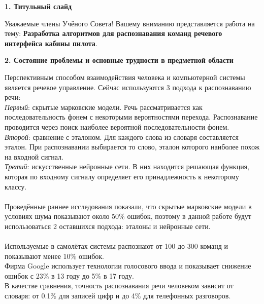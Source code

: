 \documentclass[a4paper, 12pt]{article}
\begin{document}
	
	\begin{center}
		\textbf{\large 1. Титульный слайд}
	\end{center}	
	\noindent
	Уважаемые члены Учёного Совета! Вашему вниманию представляется работа на тему: \textbf{Разработка алгоритмов для распознавания команд речевого интерфейса кабины пилота}.
	
	
	
	\begin{center}
		\textbf{\large 2. Состояние проблемы и основные трудности в предметной области}
	\end{center}	
	\noindent
	Перспективным способом взаимодействия человека и компьютерной системы является речевое управление. Сейчас используются 3 подхода к распознаванию речи:
	\\
	\textit{Первый}: скрытые марковские модели. Речь рассматривается как последовательность фонем с некоторыми вероятностями перехода. Распознавание проводится через поиск наиболее вероятной последовательности фонем.
	\\
	\textit{Второй}: сравнение с эталоном. Для каждого слова из словаря составляется эталон. При распознавании выбирается то слово, эталон которого наиболее похож на входной сигнал.
	\\
	\textit{Третий}: искусственные нейронные сети. В них находится решающая функция, которая по входному сигналу определяет его принадлежность к некоторому классу.
	\\\\
	Проведённые раннее исследования показали, что скрытые марковские модели в условиях шума показывают около 50\% ошибок, поэтому в данной работе будут использоваться 2 оставшихся подхода: эталоны и нейронные сети.
	\\\\
	Используемые в самолётах системы распознают от 100 до 300 команд и показывают менее 10\% ошибок.
	\\
	Фирма Google использует технологии голосового ввода и показывает снижение ошибок с 23\% в 13 году до 5\% в 17 году.
	\\
	В качестве сравнения, точность распознавания речи человеком зависит от словаря: от 0.1\% для записей цифр и до 4\% для телефонных разговоров.
	
	
	
\end{document}
